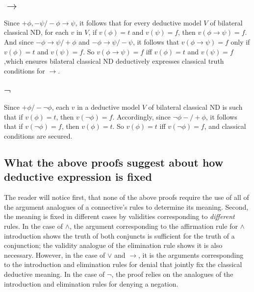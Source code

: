 \documentclass[]{article}
\begin{document}
\subsection{$\rightarrow$}
Since $+\phi, -\psi / -\phi\rightarrow\psi$, it follows that for every deductive model $V$ of bilateral classical ND, for each $v$ in $V$, if $v(\phi) = t$ and $v(\psi) = f$, then $v(\phi\rightarrow\psi) = f$. And since $-\phi\rightarrow\psi / +\phi$ and $-\phi\rightarrow\psi / -\psi$, it follows that $v(\phi\rightarrow\psi) = f$ only if $v(\phi) = t$ and $v(\psi) = f$. So $v(\phi\rightarrow\psi) = f$ iff $v(\phi) = t$ and $v(\psi) = f$,which ensures bilateral classical ND deductively expresses classical truth conditions for $\rightarrow$.
\subsection{$\neg$}
Since $+\phi / -\neg\phi$, each $v$ in a deductive model $V$ of bilateral classical ND is such that if $v(\phi) = t$, then $v(\neg\phi) = f$. Accordingly, since $\neg\phi- / +\phi$, it follows that if $v(\neg\phi) = f$, then $v(\phi) = t$. So $v(\phi) = t$ iff $v(\neg\phi) = f$, and classical conditions are secured.

\subsection{What the above proofs suggest about how deductive expression is fixed}
The reader will notice first, that none of the above proofs require the use of all of the argument analogues of a connective's rules to determine its meaning. Second, the meaning is fixed in different cases by validities corresponding to \textit{different} rules. In the case of $\wedge$, the argument corresponding to the affirmation rule for $\wedge$ introduction shows the truth of both conjuncts is sufficient for the truth of a conjunction; the validity analogue of the elimination rule shows it is also necessary. However, in the case of $\vee$ and $\rightarrow$, it is the arguments corresponding to the introduction and elimination rules for denial that jointly fix the classical deductive meaning. In the case of $\neg$, the proof relies on the analogues of the introduction and elimination rules for denying a negation.
\end{document}
